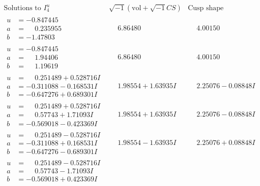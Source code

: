 \documentclass[1p]{elsarticle_modified}
\theoremstyle{definition}
\newcommand{\I}{\sqrt{-1}}
\begin{document}
$$\begin{array}{c|c|c}  
\text{Solutions to }I^u_{4}& \I (\text{vol} + \sqrt{-1}CS) & \text{Cusp shape}\\
 \hline 
\begin{aligned}
u &= -0.847445\phantom{ +0.000000I} \\
a &= \phantom{-}0.235955\phantom{ +0.000000I} \\
b &= -1.47803\phantom{ +0.000000I}\end{aligned}
 & \phantom{-}6.86480\phantom{ +0.000000I} & \phantom{-}4.00150\phantom{ +0.000000I} \\ \hline\begin{aligned}
u &= -0.847445\phantom{ +0.000000I} \\
a &= \phantom{-}1.94406\phantom{ +0.000000I} \\
b &= \phantom{-}1.19619\phantom{ +0.000000I}\end{aligned}
 & \phantom{-}6.86480\phantom{ +0.000000I} & \phantom{-}4.00150\phantom{ +0.000000I} \\ \hline\begin{aligned}
u &= \phantom{-}0.251489 + 0.528716 I \\
a &= -0.311088 - 0.168531 I \\
b &= -0.647276 + 0.689301 I\end{aligned}
 & \phantom{-}1.98554 + 1.63935 I & \phantom{-}2.25076 - 0.08848 I \\ \hline\begin{aligned}
u &= \phantom{-}0.251489 + 0.528716 I \\
a &= \phantom{-}0.57743 + 1.71093 I \\
b &= -0.569018 - 0.423369 I\end{aligned}
 & \phantom{-}1.98554 + 1.63935 I & \phantom{-}2.25076 - 0.08848 I \\ \hline\begin{aligned}
u &= \phantom{-}0.251489 - 0.528716 I \\
a &= -0.311088 + 0.168531 I \\
b &= -0.647276 - 0.689301 I\end{aligned}
 & \phantom{-}1.98554 - 1.63935 I & \phantom{-}2.25076 + 0.08848 I \\ \hline\begin{aligned}
u &= \phantom{-}0.251489 - 0.528716 I \\
a &= \phantom{-}0.57743 - 1.71093 I \\
b &= -0.569018 + 0.423369 I\end{aligned}

\end{array}$$
\end{document}
